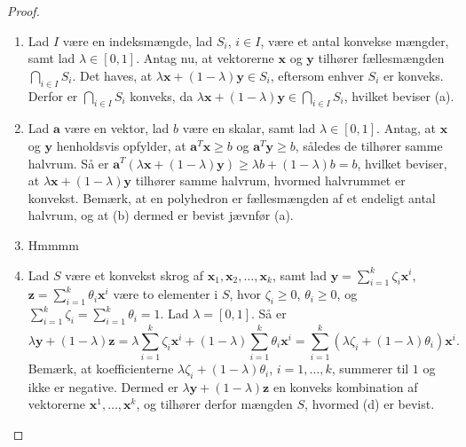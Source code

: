 %
%
\begin{proof}
\begin{enumerate}[label=(\alph*)]
	\item Lad $I$ være en indeksmængde, lad $S_i$, $i \in I$, være et antal konvekse mængder, samt lad $ \lambda \in [0,1]$.
Antag nu, at vektorerne $\textbf{x}$ og $\textbf{y}$ tilhører fællesmængden $ \bigcap_{i \in I} S_i$. Det haves, at $ \lambda \textbf{x} + (1 - \lambda )\textbf{y} \in S_i$, eftersom enhver $S_i$ er konveks. Derfor er $ \bigcap_{i \in I} S_i$ konveks, da $ \lambda \textbf{x} + (1 - \lambda )\textbf{y} \in  \bigcap_{i \in I} S_i$, hvilket beviser (a). 
	\item Lad $\textbf{a}$ være en vektor, lad $b$ være en skalar, samt lad $ \lambda \in [0,1]$. 
Antag, at $\textbf{x}$ og $\textbf{y}$ henholdsvis opfylder, at $\textbf{a}^T \textbf{x} \geq b$ og $\textbf{a}^T \textbf{y} \geq b$, således de tilhører samme halvrum. 
Så er $\textbf{a}^T (\lambda \textbf{x} + (1 - \lambda) \textbf{y} ) \geq \lambda b + (1 - \lambda ) b = b$, hvilket beviser, at $ \lambda \textbf{x} + (1 - \lambda )\textbf{y}$ tilhører samme halvrum, hvormed halvrummet er konvekst.
Bemærk, at en polyhedron er fællesmængden af et endeligt antal halvrum, og at (b) dermed er bevist jævnfør (a). 
	\item Hmmmm
	\item Lad $S$ være et konvekst skrog af $\textbf{x}_1, \textbf{x}_2, \ldots, \textbf{x}_k$, samt lad $\textbf{y} = \sum_{i=1}^{k} \zeta_i \textbf{x}^i$, $\textbf{z} = \sum_{i=1}^{k} \theta_i \textbf{x}^i$ være to elementer i $S$, hvor $ \zeta_i \geq 0$, $ \theta_i \geq 0$, og $ \sum_{i=1}^{k} \zeta_i = \sum_{i=1}^{k} \theta_i = 1$. 
	Lad $ \lambda = [0,1]$. Så er $$\lambda \textbf{y} + (1 - \lambda ) \textbf{z} = \lambda \sum_{i=1}^k \zeta_i \textbf{x}^i + (1 - \lambda) \sum_{i=1}^k \theta_i \textbf{x}^i = \sum_{i=1}^k (\lambda \zeta_i + (1-\lambda )\theta_i ) \textbf{x}^i.$$
Bemærk, at koefficienterne $ \lambda \zeta_i + (1 - \lambda) \theta_i$, $i = 1, \ldots, k$, summerer til $1$ og ikke er negative. Dermed er $ \lambda \textbf{y} + (1 - \lambda ) \textbf{z}$ en konveks kombination af vektorerne $\textbf{x}^1, \ldots, \textbf{x}^k$, og tilhører derfor mængden $S$, hvormed (d) er bevist. 
\end{enumerate}
\end{proof}